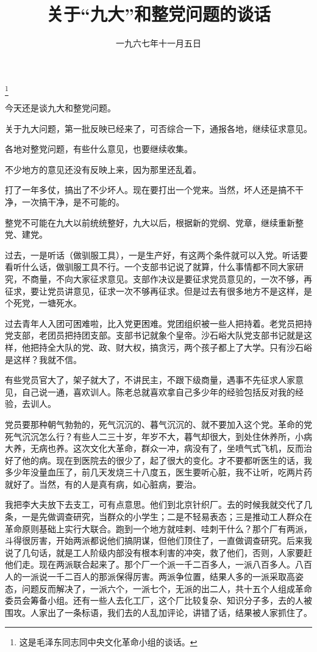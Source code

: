 
\title{关于“九大”和整党问题的谈话}
\date{一九六七年十一月五日}
\thanks{这是毛泽东同志同中央文化革命小组的谈话。}
\maketitle


今天还是谈九大和整党问题。

关于九大问题，第一批反映已经来了，可否综合一下，通报各地，继续征求意见。

各地对整党问题，有些什么意见，也要继续收集。

不少地方的意见还没有反映上来，因为那里还乱着。

打了一年多仗，搞出了不少坏人。现在要打出一个党来。当然，坏人还是搞不干净，一次搞干净，是不可能的。

整党不可能在九大以前统统整好，九大以后，根据新的党纲、党章，继续重新整党、建党。

过去，一是听话（做驯服工具），一是生产好，有这两个条件就可以入党。听话要看听什么话，做驯服工具不行。一个支部书记说了就算，什么事情都不同大家研究，不商量，不向大家征求意见。支部作决议是要征求党员意见的，一次不够，再征求，要让党员讲意见，征求一次不够再征求。但是过去有很多地方不是这样，是个死党，一塘死水。

过去青年人入团可困难啦，比入党更困难。党团组织被一些人把持着。老党员把持党支部，老团员把持团支部。支部书记就象个皇帝。沙石峪大队党支部书记就是这样，他把持全大队的党、政、财大权，搞贪污，两个孩子都上了大学。只有沙石峪是这样？我就不信。

有些党员官大了，架子就大了，不讲民主，不跟下级商量，遇事不先征求人家意见，自己说一通，喜欢训人。陈老总就喜欢拿自己多少年的经验包括反对我的经验，去训人。

党员要那种朝气勃勃的，死气沉沉的、暮气沉沉的、就不要加入这个党。革命的党死气沉沉怎么行？有些人二三十岁，年岁不大，暮气却很大，到处住休养所，小病大养，无病也养。这次文化大革命，群众一冲，病没有了，坐喷气式飞机，反而治好了他的病。现在到医院去的很少了，起了很大的变化。才不要都听医生的话，我多少年没量血压了，前几天发烧三十八度五，医生要听心脏，我不让听，吃两片药就好了。当然，有的人是真有病，如心脏病，要治。

我把李大夫放下去支工，可有点意思。他们到北京针织厂。去的时候我就交代了几条，一是先做调查研究，当群众的小学生；二是不轻易表态；三是推动工人群众在革命原则基础上实行大联合。跑到一个地方就哇剌、哇刺干什么？那个厂有两派，斗得很厉害，开始两派都说他们搞阴谋，但他们顶住了，一直做调查研究。后来我说了几句话，就是工人阶级内部没有根本利害的冲突，救了他们，否则，人家要赶他们走。现在两派联合起来了。那个厂一个派一千二百多人，一派八百多人。八百人的一派说一千二百人的那派保得厉害。两派争位置，结果人多的一派采取高姿态，问题反而解决了，一派六个，一派七个，无派的出二人，共十五个人组成革命委员会筹备小组。还有一些人去化工厂，这个厂比较复杂、知识分子多，去的人被围攻。人家出了一条标语，我们去的人乱加评论，讲错了话，结果被人家抓住了。

